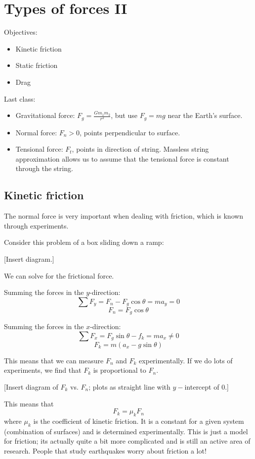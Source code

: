 \section{Types of forces II}
Objectives:
\begin{itemize}
\item Kinetic friction
\item Static friction
\item Drag
\end{itemize}

Last class:
\begin{itemize}
\item Gravitational force: $F_g=\frac{Gm_1m_2}{r^2}$, but use $F_g=mg$ near the Earth's surface.
\item Normal force: $F_n>0$, points perpendicular to surface.
\item Tensional force: $F_t$, points in direction of string. Massless string approximation allows us to assume that the tensional force is constant through the string.
\end{itemize}

\subsection{Kinetic friction}
The normal force is very important when dealing with friction, which is known through experiments.

Consider this problem of a box sliding down a ramp:

[Insert diagram.]
\vspace{5cm}

We can solve for the frictional force.

Summing the forces in the $y$-direction:
$$\sum F_y = F_n-F_g\cos\theta=ma_y=0$$
$$F_n=F_g\cos\theta$$

Summing the forces in the $x$-direction:
$$\sum F_x=F_g\sin\theta-f_k=ma_x\neq 0$$
$$F_k=m(a_x-g\sin\theta)$$

This means that we can measure $F_n$ and $F_k$ experimentally. If we do lots of experiments, we find that $F_k$ is proportional to $F_n$.

[Insert diagram of $F_k$ vs. $F_n$; plots as straight line with $y-$intercept of 0.]
\vspace{5cm}


This means that
$$\boxed{ F_k = \mu_k F_n}$$
where $\mu_k$ is the coefficient of kinetic friction. It is a constant for a given system (combination of surfaces) and is determined experimentally. This is just a model for friction; its actually quite a bit more complicated and is still an active area of research. People that study earthquakes worry about friction a lot!

